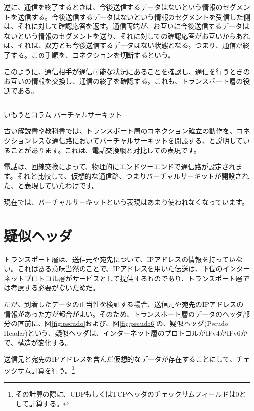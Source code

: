 逆に、通信を終了するときは、今後送信するデータはないという情報のセグメントを送信する。今後送信するデータはないという情報のセグメントを受信した側は、それに対して確認応答を返す。通信両端が、お互いに今後送信するデータはないという情報のセグメントを送り、それに対しての確認応答がお互いからあれば、それは、双方とも今後送信するデータはない状態となる。つまり、通信が終了する。この手順を、コネクションを切断するという。

このように、通信相手が通信可能な状況にあることを確認し、通信を行うときのお互いの情報を交換し、通信の終了を確認する。これも、トランスポート層の役割である。

\subsection*{}
\begin{itembox}[l]{いもうとコラム バーチャルサーキット}

古い解説書や教科書では、トランスポート層のコネクション確立の動作を、コネクションレスな通信路においてバーチャルサーキットを開設する、と説明していることがあります。これは、電話交換網と対比しての表現です。

電話は、回線交換によって、物理的にエンドツーエンドで通信路が設定されます。それと比較して、仮想的な通信路、つまりバーチャルサーキットが開設された、と表現していたわけです。

現在では、バーチャルサーキットという表現はあまり使われなくなっています。

\end{itembox}



\section{疑似ヘッダ}

トランスポート層は、送信元や宛先について、IPアドレスの情報を持っていない。これはある意味当然のことで、IPアドレスを用いた伝送は、下位のインターネットプロトコル層がサービスとして提供するものであり、トランスポート層では考慮する必要がないためだ。

だが、到着したデータの正当性を検証する場合、送信元や宛先のIPアドレスの情報があった方が都合がよい。そのため、トランスポート層のデータのヘッダ部分の直前に、図\ref{fig:pseudo}および、図\ref{fig:pseudo6}の、疑似ヘッダ(Pseudo Header)という、疑似ヘッダは、インターネット層のプロトコルがIPv4かIPv6かで、構造が変化する。


送信元と宛先のIPアドレスを含んだ仮想的なデータが存在することにして、チェックサム計算を行う。\footnote{その計算の際に、UDPもしくはTCPヘッダのチェックサムフィールドは0として計算する。}

